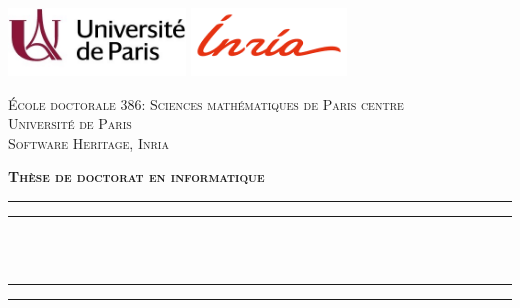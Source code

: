 \begin{titlingpage*}
\begin{SingleSpace}
\calccentering{\unitlength}

\includegraphics[height=1.8cm]{frontmatter/uni_paris.jpg}  \hfill
\includegraphics[height=1.8cm]{frontmatter/inria.png} \hfill
{}

\begin{center}
\begin{otherlanguage}{french}

    \textsc{École doctorale 386: Sciences mathématiques de Paris centre}\\
\vspace{2mm}
\textsc{Université de Paris}\\
\vspace{2mm}
\textsc{Software Heritage, Inria}\\

\vspace{4mm}

\textsc{\Large \textbf{Thèse de doctorat en informatique}}\\

\vspace*{2mm}

\rule[0.5ex]{\linewidth}{2pt}\vspace*{-\baselineskip}\vspace*{3.2pt}
\rule[0.5ex]{\linewidth}{1pt}\\[\baselineskip]
\vspace{-0.35cm}
{\huge \thetitle{}}\\
\rule[0.5ex]{\linewidth}{1pt}\vspace*{-\baselineskip}\vspace*{3.4pt}
\rule[0.5ex]{\linewidth}{2pt}\\

\vspace{2mm}


\end{otherlanguage}
\end{center}
\end{SingleSpace}
\end{titlingpage*}
